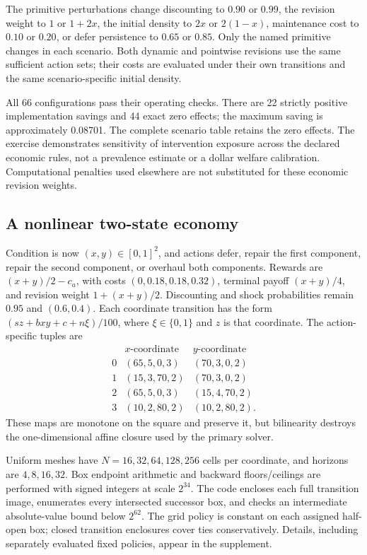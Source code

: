 The primitive perturbations change discounting to $0.90$ or $0.99$, the revision weight to $1$ or $1+2x$, the initial density to $2x$ or $2(1-x)$, maintenance cost to $0.10$ or $0.20$, or defer persistence to $0.65$ or $0.85$. Only the named primitive changes in each scenario. Both dynamic and pointwise revisions use the same sufficient action sets; their costs are evaluated under their own transitions and the same scenario-specific initial density.

All 66 configurations pass their operating checks. There are 22 strictly positive implementation savings and 44 exact zero effects; the maximum saving is approximately 0.08701. The complete scenario table retains the zero effects. The exercise demonstrates sensitivity of intervention exposure across the declared economic rules, not a prevalence estimate or a dollar welfare calibration. Computational penalties used elsewhere are not substituted for these economic revision weights.

\subsection{A nonlinear two-state economy}\label{sec:nonlinear}
Condition is now $(x,y)\in[0,1]^2$, and actions defer, repair the first component, repair the second component, or overhaul both components. Rewards are $(x+y)/2-c_a$, with costs $(0,0.18,0.18,0.32)$, terminal payoff $(x+y)/4$, and revision weight $1+(x+y)/2$. Discounting and shock probabilities remain $0.95$ and $(0.6,0.4)$. Each coordinate transition has the form $(s z+bxy+c+n\xi)/100$, where $\xi\in\{0,1\}$ and $z$ is that coordinate. The action-specific tuples are
\[
\begin{array}{c|cc}
 &x\text{-coordinate}&y\text{-coordinate}\\\hline
0&(65,5,0,3)&(70,3,0,2)\\
1&(15,3,70,2)&(70,3,0,2)\\
2&(65,5,0,3)&(15,4,70,2)\\
3&(10,2,80,2)&(10,2,80,2).
\end{array}
\]
These maps are monotone on the square and preserve it, but bilinearity destroys the one-dimensional affine closure used by the primary solver.

Uniform meshes have $N=16,32,64,128,256$ cells per coordinate, and horizons are $4,8,16,32$. Box endpoint arithmetic and backward floors/ceilings are performed with signed integers at scale $2^{34}$. The code encloses each full transition image, enumerates every intersected successor box, and checks an intermediate absolute-value bound below $2^{62}$. The grid policy is constant on each assigned half-open box; closed transition enclosures cover ties conservatively. Details, including separately evaluated fixed policies, appear in the supplement.

